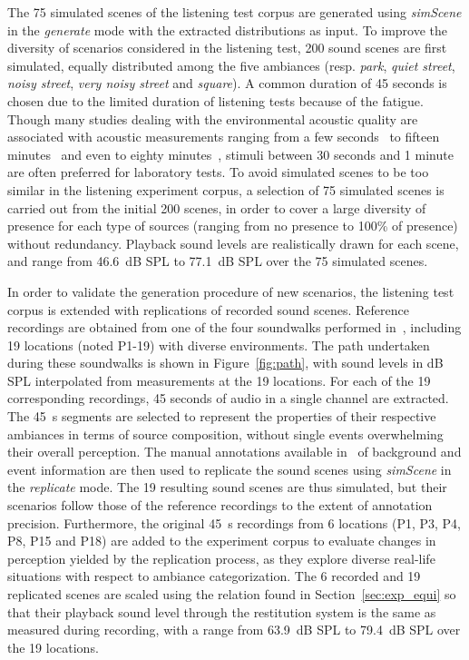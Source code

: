 \documentclass[twocolumn]{article}
\begin{document}
The 75 simulated scenes of the listening test corpus are generated using \textit{simScene} in the \textit{generate} mode with the extracted distributions as input. To improve the diversity of scenarios considered in the listening test, 200 sound scenes are first simulated, equally distributed among the five ambiances (resp. \textit{park}, \textit{quiet street}, \textit{noisy street}, \textit{very noisy street} and \textit{square}). A common duration of 45 seconds is chosen due to the limited duration of listening tests because of the fatigue. Though many studies dealing with the environmental acoustic quality are associated with acoustic measurements ranging from a few seconds~\cite{paulsen1997, brambilla2006} to fifteen minutes~\cite{kuwano1997, decoensel2007} and even to eighty minutes~\cite{namba1988}, stimuli between 30 seconds and 1 minute are often preferred for laboratory tests. To avoid simulated scenes to be too similar in the listening experiment corpus, a selection of 75 simulated scenes is carried out from the initial 200 scenes, in order to cover a large diversity of presence for each type of sources (ranging from no presence to 100\% of presence) without redundancy. Playback sound levels are realistically drawn for each scene, and range from 46.6~dB SPL to 77.1~dB SPL over the 75 simulated scenes.

In order to validate the generation procedure of new scenarios, the listening test corpus is extended with replications of recorded sound scenes. Reference recordings are obtained from one of the four soundwalks performed in~\cite{aumond2017}, including 19 locations (noted P1-19) with diverse environments. The path undertaken during these soundwalks is shown in Figure~\ref{fig:path}, with sound levels in dB SPL interpolated from measurements at the 19 locations. For each of the 19 corresponding recordings, 45 seconds of audio in a single channel are extracted. The 45~s segments are selected to represent the properties of their respective ambiances in terms of source composition, without single events overwhelming their overall perception. The manual annotations available in~\cite{gloaguen2017} of background and event information are then used to replicate the sound scenes using \textit{simScene} in the \textit{replicate} mode. The 19 resulting sound scenes are thus simulated, but their scenarios follow those of the reference recordings to the extent of annotation precision. Furthermore, the original 45~s recordings from 6 locations (P1, P3, P4, P8, P15 and P18) are added to the experiment corpus to evaluate changes in perception yielded by the replication process, as they explore diverse real-life situations with respect to ambiance categorization. The 6 recorded and 19 replicated scenes are scaled using the relation found in Section~\ref{sec:exp_equi} so that their playback sound level through the restitution system is the same as measured during recording, with a range from 63.9~dB SPL to 79.4~dB SPL over the 19 locations.
\end{document}
